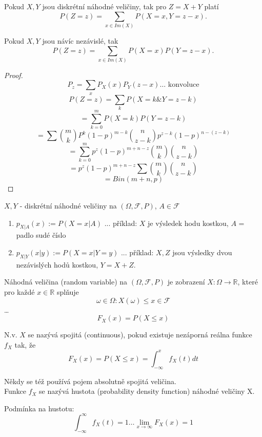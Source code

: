 \documentclass[../main.tex]{subfiles}
\begin{document}
\begin{theorem}[Konvoluce]
    Pokud $X,Y$ jsou diskrétní náhodné veličiny, tak pro $Z = X+Y$ platí
    \[P(Z=z) = \sum_{x\in Im(X)} P(X=x,Y=z-x).\]

    Pokud $X,Y$ jsou návíc nezávislé, tak 
    \[P(Z=z) = \sum_{x\in Im(X)} P(X=x)P(Y=z-x).\]
\end{theorem}
\begin{proof}
    \[P_z = \sum_x P_X(x)P_Y(z-x) \dots \text{ konvoluce}\]
    \[P(Z=z) = \sum_k P(X=k \& Y=z-k)\]
    \[ = \sum_{k=0}^m P(X=k)P(Y=z-k)\]
    \[ = \sum \binom{m}{k}P^k (1-p)^{m-k} \binom{n}{z-k}p^{z-k}(1-p)^{n-(z-k)}\]
    \[ = \sum^m_{k=0} p^z(1-p)^{m+n-z}\binom{m}{k}\binom{n}{z-k}\]
    \[ = p^z(1-p)^{m+n-z} \sum \binom{m}{k} \binom{n}{z-k}\]
    \[ = Bin(m+n,p)\]
\end{proof}

\begin{definition}
    $X,Y$ - diskrétní náhodné veličiny na $(\Omega, \mathcal{F}, P)$, $A \in \mathcal{F}$
    \begin{enumerate}
        \item $p_{X|A}(x) := P(X=x|A)$ ... příklad: $X$ je výsledek hodu kostkou, $A$ = padlo sudé číslo
        \item $p_{X|Y}(x|y) := P(X=x|Y=y)$ ... příklad: $X,Z$ jsou výsledky dvou nezávislých hodů kostkou, $Y = X+Z$.
    \end{enumerate}
\end{definition}

\begin{definition}
    Náhodná veličina (random variable) na $(\Omega,\mathcal{F},P)$ je zobrazení $X: \Omega \rightarrow \mathbb{R}$, které
    pro každé $x \in \mathbb{R}$ splňuje
    \[{\omega \in \Omega : X(\omega) \leq x} \in \mathcal{F}\]
    \dots
    \[F_X(x) = P(X\leq x)\]
\end{definition}

\begin{definition}
    N.v. $X$ se nazývá spojitá (continuous), pokud existuje nezáporná reálna funkce $f_X$ tak, že 
    \[F_X(x) = P(X\leq x) = \int^x_{-\infty} f_X(t)dt\]

    Někdy se též používá pojem absolutně spojitá veličina.\\

    Funkce $f_X$ se nazývá hustota (probability density function) náhodné veličiny X.

    Podmínka na hustotu: 
    \[\int^\infty_{-\infty} f_X(t) =  1 \dots \lim_{x\rightarrow \infty} F_X(x) =1\]
\end{definition}
\end{document}
